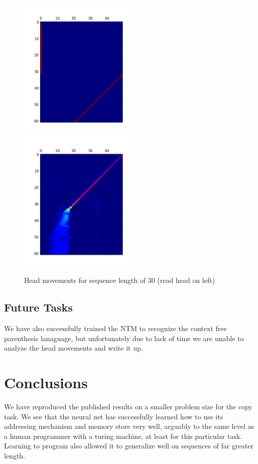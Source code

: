 \documentclass[12pt]{article}
\begin{document}
\begin{figure}[h]
\includegraphics[width=0.5\textwidth]{read_head}
\includegraphics[width=0.5\textwidth]{write_head}
\caption{Head movements for sequence length of 30 (read head on left)}
\end{figure}

\subsection{Future Tasks}

We have also successfully trained the NTM to recognize
the context free parenthesis lanaguage, but unfortunately due to lack
of time we are unable to analyze the head movements and write it up.

\section{Conclusions}\label{conclusions}

We have reproduced the published results on a smaller problem size for the
copy task. We see that the neural net has successfully learned how to
use its addressing mechanism and memory store very well, arguably to the
same level as a human programmer with a turing machine, at least for this
particular task. Learning to program also allowed it to generalize
well on sequences of far greater length.



\end{document}
